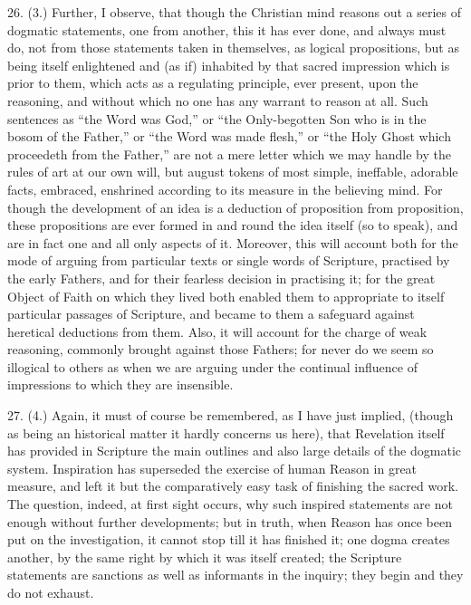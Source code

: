 26. (3.) Further, I observe, that though the Christian mind reasons
out a series of dogmatic statements, one from another, this it has
ever done, and always must do, not from those statements taken in
themselves, as logical propositions, but as being itself enlightened
and (as if) inhabited by that sacred impression which is prior to
them, which acts as a regulating principle, ever present, upon the
reasoning, and without which no one has any warrant to reason at all.
Such sentences as ``the Word was God,'' or ``the
Only-begotten Son who is in the bosom of the Father,'' or
``the Word was made flesh,'' or ``the Holy Ghost which
proceedeth from the Father,'' are not a mere letter which we may
handle by the rules of art at our own will, but august tokens of most
simple, ineffable, adorable facts, embraced, enshrined according to
its measure in the believing mind. For though the development of an
idea is a deduction of proposition from proposition, these
propositions are ever formed in and round the idea itself (so to
speak), and are in fact one and all only aspects of it. Moreover, this
will account both for the mode of arguing from particular texts or
single words of Scripture, practised by the early Fathers, and for
their fearless decision in practising it; for the great Object of
Faith on which they lived both enabled them to appropriate to itself
particular passages of Scripture, and became to them a safeguard
against heretical deductions from them. Also, it will account for the
charge of weak reasoning, commonly brought against those Fathers; for
never do we seem so illogical to others as when we are arguing under
the continual influence of impressions to which they are insensible.

27. (4.) Again, it must of course be remembered, as I have just
implied, (though as being an historical matter it hardly concerns us
here), that Revelation itself has provided in Scripture the main
outlines and also large details of the dogmatic system. Inspiration
has superseded the exercise of human Reason in great measure, and left
it but the comparatively easy task of finishing the sacred work. The
question, indeed, at first sight occurs, why such inspired statements
are not enough without further developments; but in truth, when Reason
has once been put on the investigation, it cannot stop till it has
finished it; one dogma creates another, by the same right by which it
was itself created; the Scripture statements are sanctions as well as
informants in the inquiry; they begin and they do not exhaust.

